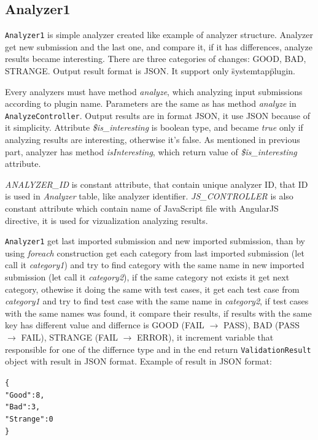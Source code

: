 \subsection{Analyzer1}

\texttt{Analyzer1} is simple analyzer created like example of analyzer structure. Analyzer get new submission and the last one, and compare it, if it has differences, analyze results became interesting. There are three categories of changes: GOOD, BAD, STRANGE. Output result format is JSON. It support only \"systemtap\" plugin.

Every analyzers must have method \emph{analyze}, which analyzing input submissions according to plugin name. Parameters are the same as has method \emph{analyze} in \texttt{AnalyzeController}. Output results are in format JSON, it use JSON because of it simplicity. Attribute \emph{\$is\_interesting} is boolean type, and became \emph{true} only if analyzing results are interesting, otherwise it's false. As mentioned in previous part, analyzer has method \emph{isInteresting}, which return value of \emph{\$is\_interesting} attribute.

\emph{ANALYZER\_ID} is constant attribute, that contain unique analyzer ID, that ID is used in \emph{Analyzer} table, like analyzer identifier. \emph{JS\_CONTROLLER} is also constant attribute which contain name of JavaScript file with AngularJS directive, it is used for vizualization analyzing results.

\texttt{Analyzer1} get last imported submission and new imported submission, than by using \emph{foreach} construction get each category from last imported submission (let call it \emph{category1}) and try to find category with the same name in new imported submission (let call it \emph{category2}), if the same category not exists it get next category, othewise it doing the same with test cases, it get each test case from \emph{category1} and try to find test case with the same name in \emph{category2}, if test cases with the same names was found, it compare their results, if results with the same key has different value and differnce is GOOD (FAIL $\rightarrow$ PASS), BAD (PASS $\rightarrow$ FAIL), STRANGE (FAIL $\rightarrow$ ERROR), it increment variable that responsible for one of the differnce type and in the end return \texttt{ValidationResult} object with result in JSON format. Example of result in JSON format:
\begin{alltt}
\{
    "Good": 8,
    "Bad": 3,
    "Strange": 0
\}
\end{alltt}

